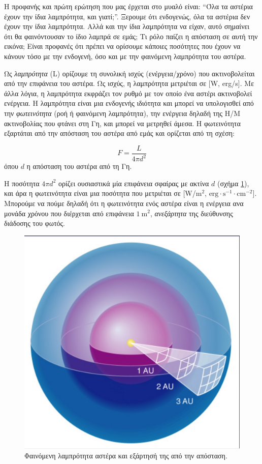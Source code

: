 Η προφανής και πρώτη ερώτηση που μας έρχεται στο μυαλό είναι:
``Όλα τα αστέρια έχουν την ίδια λαμπρότητα, και γιατί;''. Ξερουμε ότι ενδογενώς, όλα τα αστέρια δεν έχουν την ίδια λαμπρότητα. Αλλά και την ίδια λαμπρότητα να είχαν, αυτό σημαίνει ότι θα φαινόντουσαν το ίδιο λαμπρά σε εμάς; Τι ρόλο παίζει η απόσταση σε αυτή την εικόνα; Είναι προφανές ότι πρέπει να ορίσουμε κάποιες ποσότητες που έχουν να κάνουν τόσο με την ενδογενή, όσο και με την φαινόμενη λαμπρότητα του αστέρα.

Ως \textit{λαμπρότητα} (L) ορίζουμε τη συνολική ισχύς (ενέργεια/χρόνο) που ακτινοβολείται από την επιφάνεια του αστέρα. Ως ισχύς, η λαμπρότητα μετριέται σε [W, erg/s]. Με άλλα λόγια, η λαμπρότητα εκφράζει τον ρυθμό με τον οποίο ένα αστέρι ακτινοβολεί ενέργεια. Η λαμπρότητα είναι μια ενδογενής ιδιότητα και μπορεί να υπολογισθεί από την \textit{φωτεινότητα} (ροή ή φαινόμενη λαμπρότητα), την ενέργεια δηλαδή της Η/Μ ακτινοβολίας που φτάνει στη Γη, και μπορεί να μετρηθεί άμεσα. Η φωτεινότητα εξαρτάται από την απόσταση του αστέρα από εμάς και ορίζεται από τη σχέση:

\begin{equation}
    F = \frac{L}{4 \pi d^2}
\end{equation}
όπου $d$ η απόσταση του αστέρα από τη Γη.

Η ποσότητα $4 \pi d^2$ ορίζει ουσιαστικά μία επιφάνεια σφαίρας με ακτίνα $d$ (σχήμα \ref{fig:flux}), και άρα η φωτεινότητα είναι μια ποσότητα που μετριέται σε [W/$\text{m}^2$, $\text{erg} \cdot \text{s}^{-1} \cdot \text{cm}^{-2}$]. Μπορούμε να πούμε δηλαδή ότι η φωτεινότητα ενός αστέρα είναι η ενέργεια ανα μονάδα χρόνου που διέρχεται από επιφάνεια $1 \ \text{m}^2$, \textit{ανεξάρτητα} της διεύθυνσης διάδοσης του φωτός.

\begin{figure}[h]
    \centering
    \includegraphics[scale=0.3]{Figures/flux.png}
    \caption{Φαινόμενη λαμπρότητα αστέρα και εξάρτησή της από την απόσταση.}
    \label{fig:flux}
\end{figure}

